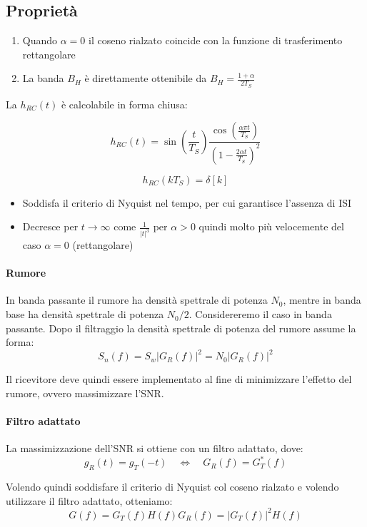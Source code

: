 \subsection*{Propriet\`a}
\begin{enumerate}
    \item Quando \( \alpha = 0 \) il coseno rialzato coincide con la funzione di trasferimento rettangolare
    \item La banda \( B_H \) \`e direttamente ottenibile da \( B_H = \frac{1+\alpha}{2T_S} \)
\end{enumerate}

La \( h_{RC}(t) \) \`e calcolabile in forma chiusa:

\[ h_{RC}(t) = \sin\left(\frac{t}{T_S}\right) \frac{\cos\left(\frac{\alpha \pi t}{T_S}\right)}{\left(1- \frac{2\alpha t}{T_S}\right)^2}  \]

\[ h_{RC}(kT_S) = \delta[k] \]

\begin{itemize}
    \item Soddisfa il criterio di Nyquist nel tempo, per cui garantisce l'assenza di ISI
    \item Decresce per \( t \rightarrow \infty \) come \( \frac{1}{|t|^3} \) per \( \alpha > 0 \) quindi molto pi\`u velocemente del caso \( \alpha = 0 \) (rettangolare)
\end{itemize}


\paragraph*{Rumore}
In banda passante il rumore ha densità spettrale di potenza $N_0$, mentre in banda base ha densità spettrale di potenza $N_0/2$.
Considereremo il caso in banda passante.
Dopo il filtraggio la densità spettrale di potenza del rumore assume la forma:
\[
    S_n(f) = S_w |G_R(f)|^2 = N_0 |G_R(f)|^2
\]

Il ricevitore deve quindi essere implementato al fine di minimizzare l'effetto del rumore, ovvero massimizzare l'SNR.

\paragraph*{Filtro adattato}
La massimizzazione dell'SNR si ottiene con un filtro adattato, dove:
\[
    g_R(t) = g_T(-t) \quad \Longleftrightarrow \quad G_R(f) = G_T^*(f)
\]

Volendo quindi soddisfare il criterio di Nyquist col coseno rialzato e volendo utilizzare il filtro adattato, otteniamo:
\[
    G(f) = G_T(f) H(f) G_R(f) = |G_T(f)|^2 H(f)
\]

